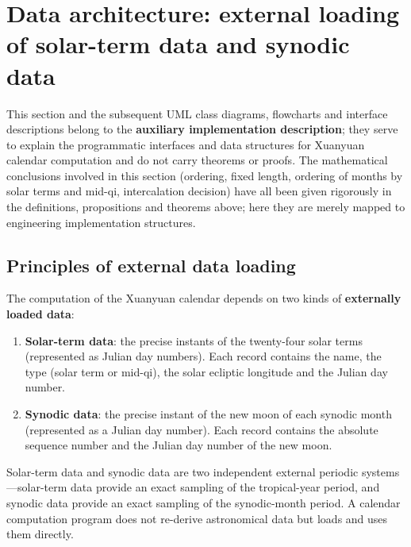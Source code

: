 \section{Data architecture: external loading of solar-term data and synodic data}
\label{sec:calendar_data_architecture}

\begin{remark}\label{rem:calendar_data_positioning}
This section and the subsequent UML class diagrams, flowcharts and interface descriptions belong to the \textbf{auxiliary implementation description}; they serve to explain the programmatic interfaces and data structures for Xuanyuan calendar computation and do not carry theorems or proofs. The mathematical conclusions involved in this section (ordering, fixed length, ordering of months by solar terms and mid-qi, intercalation decision) have all been given rigorously in the definitions, propositions and theorems above; here they are merely mapped to engineering implementation structures.
\end{remark}

\subsection{Principles of external data loading}

\begin{definition}\label{def:external_data_loading}
The computation of the Xuanyuan calendar depends on two kinds of \textbf{externally loaded data}:
\begin{enumerate}[label=(\roman*)]
    \item \textbf{Solar-term data}: the precise instants of the twenty-four solar terms (represented as Julian day numbers). Each record contains the name, the type (solar term or mid-qi), the solar ecliptic longitude and the Julian day number.
    \item \textbf{Synodic data}: the precise instant of the new moon of each synodic month (represented as a Julian day number). Each record contains the absolute sequence number and the Julian day number of the new moon.
\end{enumerate}
Solar-term data and synodic data are two independent external periodic systems---solar-term data provide an exact sampling of the tropical-year period, and synodic data provide an exact sampling of the synodic-month period. A calendar computation program does not re-derive astronomical data but loads and uses them directly.
\end{definition}

